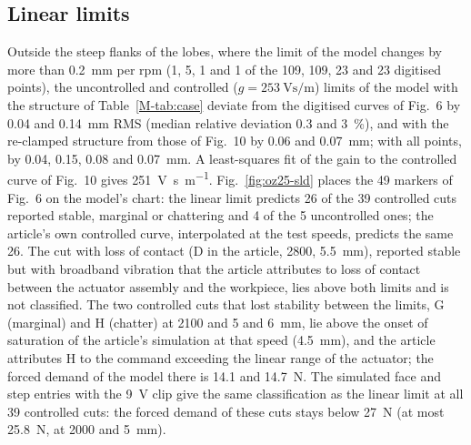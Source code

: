 \subsection{Linear limits}\label{supp:oz25-lin}

Outside the steep flanks of the lobes, where the limit of the model changes by more than \SI{0.2}{\milli\metre} per rpm (1, 5, 1 and 1 of the 109, 109, 23 and 23 digitised points), the uncontrolled and controlled ($g=\SI{253}{\volt\second\per\metre}$) limits of the model with the structure of Table~\ref{M-tab:case} deviate from the digitised curves of Fig.~6 by 0.04 and \SI{0.14}{\milli\metre} RMS (median relative deviation 0.3 and \SI{3}{\percent}), and with the re-clamped structure from those of Fig.~10 by 0.06 and \SI{0.07}{\milli\metre}; with all points, by 0.04, 0.15, 0.08 and \SI{0.07}{\milli\metre}. A least-squares fit of the gain to the controlled curve of Fig.~10 gives \SI{251}{\volt\second\per\metre}. Fig.~\ref{fig:oz25-sld} places the 49 markers of Fig.~6 on the model's chart: the linear limit predicts 26 of the 39 controlled cuts reported stable, marginal or chattering and 4 of the 5 uncontrolled ones; the article's own controlled curve, interpolated at the test speeds, predicts the same 26. The cut with loss of contact (D in the article, \SI{2800}{\rpm}, \SI{5.5}{\milli\metre}), reported stable but with broadband vibration that the article attributes to loss of contact between the actuator assembly and the workpiece, lies above both limits and is not classified. The two controlled cuts that lost stability between the limits, G (marginal) and H (chatter) at \SI{2100}{\rpm} and 5 and \SI{6}{\milli\metre}, lie above the onset of saturation of the article's simulation at that speed (\SI{4.5}{\milli\metre}), and the article attributes H to the command exceeding the linear range of the actuator; the forced demand of the model there is 14.1 and \SI{14.7}{\newton}. The simulated face and step entries with the \SI{9}{\volt} clip give the same classification as the linear limit at all 39 controlled cuts: the forced demand of these cuts stays below \SI{27}{\newton} (at most \SI{25.8}{\newton}, at \SI{2000}{\rpm} and \SI{5}{\milli\metre}).

